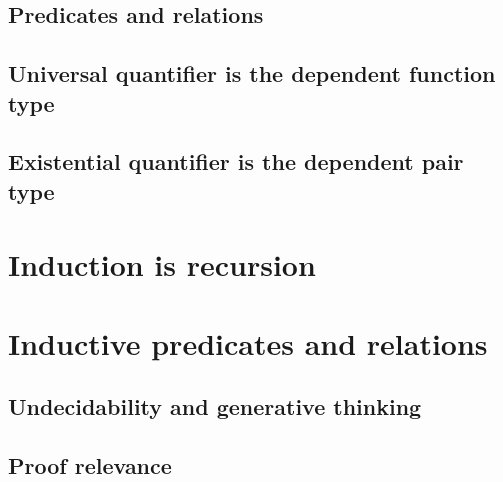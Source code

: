 \documentclass{beamer}
\begin{document}
\subsection{Predicates and relations}

\subsection{Universal quantifier is the dependent function type}
\subsection{Existential quantifier is the dependent pair type}

\section{Induction is recursion}


\section{Inductive predicates and relations}

\subsection{Undecidability and generative thinking}

\subsection{Proof relevance}
\end{document}
